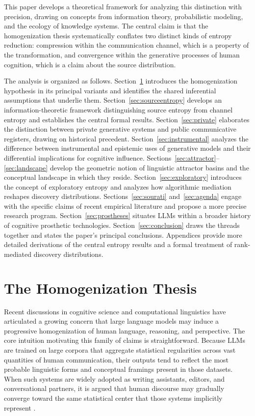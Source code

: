 \documentclass[12pt,a4paper]{article}
\theoremstyle{definition}
\theoremstyle{plain}
\theoremstyle{remark}
\begin{document}
This paper develops a theoretical framework for analyzing this distinction with precision,
drawing on concepts from information theory, probabilistic modeling, and the ecology of
knowledge systems. The central claim is that the homogenization thesis systematically conflates
two distinct kinds of entropy reduction: compression within the communication channel, which
is a property of the transformation, and convergence within the generative processes of human
cognition, which is a claim about the source distribution.

The analysis is organized as follows. Section~\ref{sec:homogenization} introduces the
homogenization hypothesis in its principal variants and identifies the shared inferential
assumptions that underlie them. Section~\ref{sec:sourceentropy} develops an
information-theoretic framework distinguishing source entropy from channel entropy and
establishes the central formal results. Section~\ref{sec:private} elaborates the distinction
between private generative systems and public communicative registers, drawing on historical
precedent. Section~\ref{sec:instrumental} analyzes the difference between instrumental and
epistemic uses of generative models and their differential implications for cognitive
influence. Sections~\ref{sec:attractor}--\ref{sec:landscape} develop the geometric notion
of linguistic attractor basins and the conceptual landscape in which they reside.
Section~\ref{sec:exploratory} introduces the concept of exploratory entropy and analyzes
how algorithmic mediation reshapes discovery distributions. Sections~\ref{sec:sourati}
and~\ref{sec:agenda} engage with the specific claims of recent empirical literature and
propose a more precise research program. Section~\ref{sec:prostheses} situates LLMs within
a broader history of cognitive prosthetic technologies. Section~\ref{sec:conclusion} draws
the threads together and states the paper's principal conclusions. Appendices provide more
detailed derivations of the central entropy results and a formal treatment of rank-mediated
discovery distributions.

\section{The Homogenization Thesis}
\label{sec:homogenization}

Recent discussions in cognitive science and computational linguistics have articulated a
growing concern that large language models may induce a progressive homogenization of human
language, reasoning, and perspective. The core intuition motivating this family of claims is
straightforward. Because LLMs are trained on large corpora that aggregate statistical
regularities across vast quantities of human communication, their outputs tend to reflect the
most probable linguistic forms and conceptual framings present in those datasets. When such
systems are widely adopted as writing assistants, editors, and conversational partners, it is
argued that human discourse may gradually converge toward the same statistical center that
those systems implicitly represent \citep{sourati2026}.
\end{document}
